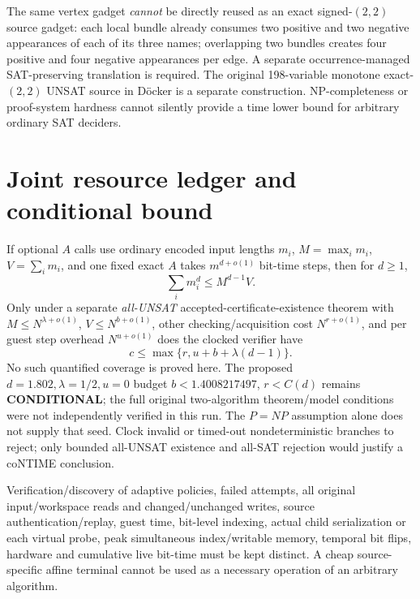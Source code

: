 \documentclass[11pt]{article}
\begin{document}
The same vertex gadget \emph{cannot} be directly
reused as an exact signed-$(2,2)$ source gadget:
each local bundle already consumes two positive and two negative
appearances of each of its three names; overlapping two bundles
creates four positive and four negative appearances per edge.
A separate occurrence-managed SAT-preserving translation is
required. The original 198-variable monotone exact-$(2,2)$
UNSAT source in D\"ocker is a separate construction.
NP-completeness or proof-system hardness cannot silently provide
a time lower bound for arbitrary ordinary SAT deciders.

\section{Joint resource ledger and conditional bound}
If optional $A$ calls use ordinary encoded input lengths $m_i$,
$M=\max_i m_i$, $V=\sum_i m_i$, and one fixed exact $A$
takes $m^{d+o(1)}$ bit-time steps, then for $d\ge1$,
\[
\sum_i m_i^d\le M^{d-1}V.
\]
Only under a separate \emph{all-UNSAT}
accepted-certificate-existence theorem with
$M\le N^{\lambda+o(1)}$,
$V\le N^{b+o(1)}$, other checking/acquisition cost
$N^{r+o(1)}$, and per guest step overhead
$N^{u+o(1)}$ does the clocked verifier have
\[
c\le\max\{r,u+b+\lambda(d-1)\}.
\]
No such quantified coverage is proved here.
The proposed $d=1.802,\lambda=1/2,u=0$ budget
$b<1.4008217497$, $r<C(d)$ remains
\textbf{CONDITIONAL}; the full original two-algorithm
theorem/model conditions were not independently
verified in this run.
The $P=NP$ assumption alone does not supply that seed.
Clock invalid or timed-out nondeterministic branches to reject;
only bounded all-UNSAT existence and all-SAT rejection would
justify a coNTIME conclusion.

Verification/discovery of adaptive policies, failed attempts,
all original input/workspace reads and changed/unchanged writes,
source authentication/replay, guest time, bit-level indexing,
actual child serialization or each virtual probe,
peak simultaneous index/writable memory, temporal bit flips,
hardware and cumulative live bit-time must be kept distinct.
A cheap source-specific affine terminal cannot be used
as a necessary operation of an arbitrary algorithm.
\end{document}

